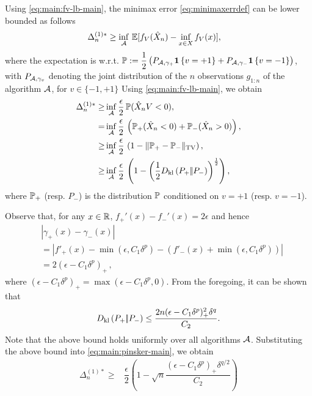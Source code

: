 Using \eqref{eq:main:fv-lb-main}, the minimax error \eqref{eq:minimaxerrdef} can be lower bounded as follows
\begin{align}
\MoveEqLeft 
\Delta_n^{(1)*} %
  \ge  \inf_{\A} \,  \E[f_V(\hat X_n) - \inf_{x \in X}
  f_V(x)],\label{eq:main:avg-bd}
  \end{align}
where the expectation is w.r.t. $\P:= \dfrac{1}{2} \left(P_{\A, \gamma_+} \indic{v=+1} + P_{\A, \gamma_-}\indic{v=-1}\right)$, with $P_{\A,\gamma_v}$ denoting the joint distribution of the $n$ observations $g_{1:n}$ of the algorithm $\A$, for $v \in \{-1,+1\}$
Using \eqref{eq:main:fv-lb-main}, we obtain
\begin{align}
\Delta_n^{(1)*}  \ge & \inf_{\A} \dfrac{\epsilon}{2}\,  \P(\hat X_n V < 0), \label{eq:main:strong-convex-bd}\\
  = & \inf_{\A} \dfrac{\epsilon }{2} \, \left(\P_{+}(\hat X_n < 0) + \P_{-}(\hat X_n > 0)\right), \label{eq:main:Pplus}\\
  \ge &\inf_{\A} \dfrac{\epsilon }{2} \,\left(1 - \tvnorm{\P_{+}- \P_{-}}\right), \label{eq:main:lecam}\\
  \ge &\inf_{\A} \dfrac{\epsilon }{2}  \,\left( 1 - \left(\frac12\dkl{P_{+}}{P_{-}}\right)^{\frac{1}{2}}\right), \label{eq:main:pinsker-main}
\end{align}
where $\P_{+}$ (resp. $P_-$) is the distribution $\P$ conditioned on $v=+1$ (resp. $v=-1$).

Observe that, for any $x\in \R$, $f_+'(x) - f_-'(x) = 2\epsilon$ and hence
\begin{align}
& |\gamma_+(x) - \gamma_-(x)| \nonumber\\
& = | f'_+(x) - \min(\epsilon,C_1 \delta^p) - (f'_-(x)+\min(\epsilon,C_1 \delta^p)) | \nonumber \\
& = 2 (\epsilon - C_1 \delta^p)_+\,,
 \label{eq:main:gdiff-ub}
\end{align}
where $(\epsilon - C_1 \delta^p)_+ = \max(\epsilon - C_1 \delta^p,0)$. 
From the foregoing, it can be shown that 
\begin{align}
\dkl{P_{+}}{P_{-}} \le \dfrac{2n(\epsilon-C_1\delta^p)_+^2 \delta^q}{C_2}.\label{eq:main:dkbd-main}
\end{align}
Note that the above bound holds uniformly over all algorithms $\A$. 
Substituting the above bound into \eqref{eq:main:pinsker-main}, we obtain 
\begin{align}
 \Delta_n^{(1)*}
  \ge & \dfrac{\epsilon}{2} \left(1 - \sqrt{
    n}  \dfrac{(\epsilon-C_1\delta^p)_+\delta^{q/2}}{C_2}
  \right)\label{eq:main:final-lower-bd}
\end{align}


